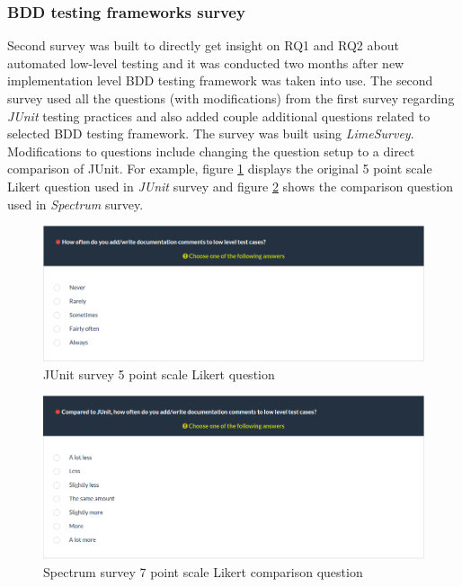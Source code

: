     \subsubsection{BDD testing frameworks survey}
    Second survey was built to directly get insight on RQ1 and RQ2 about automated low-level testing
    and it was conducted two months after new implementation level BDD testing framework was taken into use.
    The second survey used all the questions (with modifications) from the first survey regarding \textit{JUnit} testing practices and
    also added couple additional questions related to selected BDD testing framework. The survey was built using \textit{LimeSurvey}.
    Modifications to questions include changing the question setup to a direct comparison of JUnit.
    For example, figure \ref{fig:survey-junit-comments} displays the original 5 point scale Likert question used in \textit{JUnit} survey and
    figure \ref{fig:survey-bdd-comments} shows the comparison question used in \textit{Spectrum} survey.
    \begin{figure}[H]
      \begin{center}
        \includegraphics[width=13.7cm]{images/survey-org-comments.png}
        \caption{JUnit survey 5 point scale Likert question}
        \label{fig:survey-junit-comments}
      \end{center}
    \end{figure}
    \begin{addmargin}[0em]{0em}
    \end{addmargin}
    \begin{figure}[ht]
      \begin{center}
        \includegraphics[width=13.7cm]{images/survey-bdd-comments.png}
        \caption{Spectrum survey 7 point scale Likert comparison question}
        \label{fig:survey-bdd-comments}
      \end{center}
    \end{figure}

